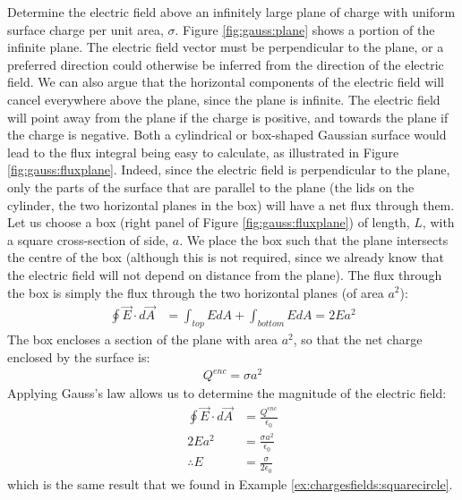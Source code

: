 \newpage
\begin{example}{Determine the electric field above an infinitely large plane of charge with uniform surface charge per unit area, $\sigma$.} \label{ex:gauss:infiniteplate}
Figure \ref{fig:gauss:plane} shows a portion of the infinite plane. The electric field vector must be perpendicular to the plane, or a preferred direction could otherwise be inferred from the direction of the electric field. We can also argue that the horizontal components of the electric field will cancel everywhere above the plane, since the plane is infinite. The electric field will point away from the plane if the charge is positive, and towards the plane if the charge is negative. 
Both a cylindrical or box-shaped Gaussian surface would lead to the flux integral being easy to calculate, as illustrated in Figure \ref{fig:gauss:fluxplane}. Indeed, since the electric field is perpendicular to the plane, only the parts of the surface that are parallel to the plane (the lids on the cylinder, the two horizontal planes in the box) will have a net flux through them.
Let us choose a box (right panel of Figure \ref{fig:gauss:fluxplane}) of length, $L$, with a square cross-section of side, $a$. We place the box such that the plane intersects the centre of the box (although this is not required, since we already know that the electric field will not depend on distance from the plane). The flux through the box is simply the flux through the two horizontal planes (of area $a^2$):
\begin{align*}
\oint \vec E\cdot d\vec A&= \int_{top} EdA+\int_{bottom}EdA=2Ea^2
\end{align*}
The box encloses a section of the plane with area $a^2$, so that the net charge enclosed by the surface is:
\begin{align*}
Q^{enc}=\sigma a^2
\end{align*}
Applying Gauss's law allows us to determine the magnitude of the electric field:
\begin{align*}
\oint \vec E\cdot d\vec A&=\frac{Q^{enc}}{\epsilon_0} \\
2Ea^2&= \frac{\sigma a^2}{\epsilon_0}\\
\therefore E&= \frac{\sigma}{2\epsilon_0}
\end{align*}
which is the same result that we found in Example \ref{ex:chargesfields:squarecircle}.


\end{example}
